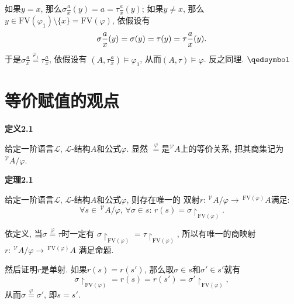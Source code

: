 \begin{enumerate}
    \vspace{3pt}\hspace{2.17em}
    如果$y=x$, 那么$\displaystyle\sigma\frac{a}{x}(y)=a=\tau\frac{a}{x}(y)$;
    如果$y\neq x$, 那么$y\in\mathrm{FV}(\varphi_1)\setminus\{x\}
    =\mathrm{FV}(\varphi)$, 依假设有
    \vspace{3pt}
    \[
        \sigma\frac{a}{x}(y)=\sigma(y)=\tau(y)=\tau\frac{a}{x}(y).\\[3pt]
    \]
    于是$\displaystyle\sigma\frac{a}{x}\overset{\displaystyle\varphi_1}{=}
    \tau\frac{a}{x}$, 依假设有
    $\displaystyle\left(A,\tau\frac{a}{x}\right)\models\varphi_1$,
    从而$(A,\tau)\models\varphi$. 反之同理. \hfill $\qedsymbol$
\end{enumerate}





\newpage

\section{等价赋值的观点}

\hypertarget{sec:定义2.1}{}
\noindent\textbf{定义2.1}

给定一阶语言$\mathcal{L}$, $\mathcal{L}$-结构$A$和公式$\varphi$. 显然
$\overset{\displaystyle\varphi}{=}$是$^{\mathcal{V}}\!A$上的等价关系,
把其商集记为$^{\mathcal{V}}\!A/\varphi$.

\vspace{10pt}

\hypertarget{sec:定理2.1}{}
\noindent\textbf{定理2.1}

给定一阶语言$\mathcal{L}$, $\mathcal{L}$-结构$A$和公式$\varphi$, 则存在唯一的
双射$r:\,^{\mathcal{V}}\!A/\varphi\to\,^{\mathrm{FV}(\varphi)}A$满足:
\[
    \forall s\in\,\!^{\mathcal{V}}\!A/\varphi,\,\forall\sigma\in s:\,
    r(s)=\sigma\!\restriction_{\mathrm{FV}(\varphi)}.
\]


依定义, 当$\sigma\overset{\displaystyle\varphi}{=}\tau$时一定有
$\sigma\!\restriction_{\mathrm{FV}(\varphi)}=\tau\!\restriction_{\mathrm{FV}(\varphi)}$,
所以有唯一的商映射$r:\,^{\mathcal{V}}\!A/\varphi\to\,^{\mathrm{FV}(\varphi)}A$
满足命题.

然后证明$r$是单射. 如果$r(s)=r(s')$, 那么取$\sigma\in s$和$\sigma'\in s'$就有
\[
    \sigma\!\restriction_{\mathrm{FV}(\varphi)}=r(s)=r(s')=\sigma'\!\restriction_{\mathrm{FV}(\varphi)},
\]
从而$\sigma\overset{\displaystyle\varphi}{=}\sigma'$, 即$s=s'$.

